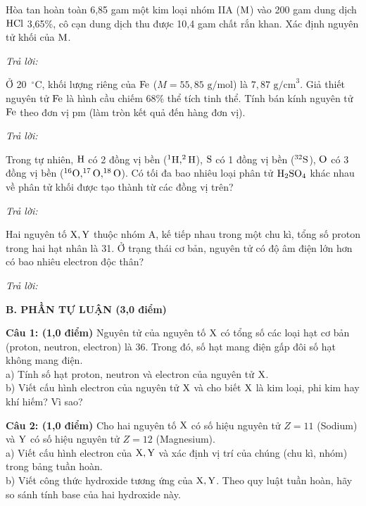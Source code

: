 \documentclass[11pt,a4paper]{article}
\begin{document}
\begin{ex}
Hòa tan hoàn toàn 6,85 gam một kim loại nhóm IIA ($\ce{M}$) vào 200 gam dung dịch $\ce{HCl}$ 3,65\%, cô cạn dung dịch thu được 10,4 gam chất rắn khan. Xác định nguyên tử khối của $\ce{M}$.

\noindent\textit{Trả lời:} \dotfill
\end{ex}
\begin{ex}
Ở 20~$^\circ\text{C}$, khối lượng riêng của $\ce{Fe}$ ($M = 55,85\text{ g/mol}$) là $7,87\text{ g/cm}^3$. Giả thiết nguyên tử $\ce{Fe}$ là hình cầu chiếm 68\% thể tích tinh thể. Tính bán kính nguyên tử $\ce{Fe}$ theo đơn vị pm (làm tròn kết quả đến hàng đơn vị).

\noindent\textit{Trả lời:} \dotfill
\end{ex}
\begin{ex}
Trong tự nhiên, $\ce{H}$ có 2 đồng vị bền ($^1\ce{H}, ^2\ce{H}$), $\ce{S}$ có 1 đồng vị bền ($^{32}\ce{S}$), $\ce{O}$ có 3 đồng vị bền ($^{16}\ce{O}, ^{17}\ce{O}, ^{18}\ce{O}$). Có tối đa bao nhiêu loại phân tử $\ce{H2SO4}$ khác nhau về phân tử khối được tạo thành từ các đồng vị trên?

\noindent\textit{Trả lời:} \dotfill
\end{ex}
\begin{ex}
Hai nguyên tố $\ce{X, Y}$ thuộc nhóm A, kế tiếp nhau trong một chu kì, tổng số proton trong hai hạt nhân là 31. Ở trạng thái cơ bản, nguyên tử có độ âm điện lớn hơn có bao nhiêu electron độc thân?

\noindent\textit{Trả lời:} \dotfill
\end{ex}
\vspace{6pt}
\noindent
{\color{mainGreen}\textbf{\Large B. PHẦN TỰ LUẬN (3,0 điểm)}}
\vspace{2pt}

\noindent
\textbf{Câu 1: (1,0 điểm)} Nguyên tử của nguyên tố $\ce{X}$ có tổng số các loại hạt cơ bản (proton, neutron, electron) là 36. Trong đó, số hạt mang điện gấp đôi số hạt không mang điện.\\
a) Tính số hạt proton, neutron và electron của nguyên tử $\ce{X}$.\\
b) Viết cấu hình electron của nguyên tử $\ce{X}$ và cho biết $\ce{X}$ là kim loại, phi kim hay khí hiếm? Vì sao?

\vspace{1pt}
\noindent
{}

\vspace{4pt}
\noindent
\textbf{Câu 2: (1,0 điểm)} Cho hai nguyên tố $\ce{X}$ có số hiệu nguyên tử $Z = 11$ (Sodium) và $\ce{Y}$ có số hiệu nguyên tử $Z = 12$ (Magnesium).\\
a) Viết cấu hình electron của $\ce{X, Y}$ và xác định vị trí của chúng (chu kì, nhóm) trong bảng tuần hoàn.\\
b) Viết công thức hydroxide tương ứng của $\ce{X, Y}$. Theo quy luật tuần hoàn, hãy so sánh tính base của hai hydroxide này.
\end{document}
